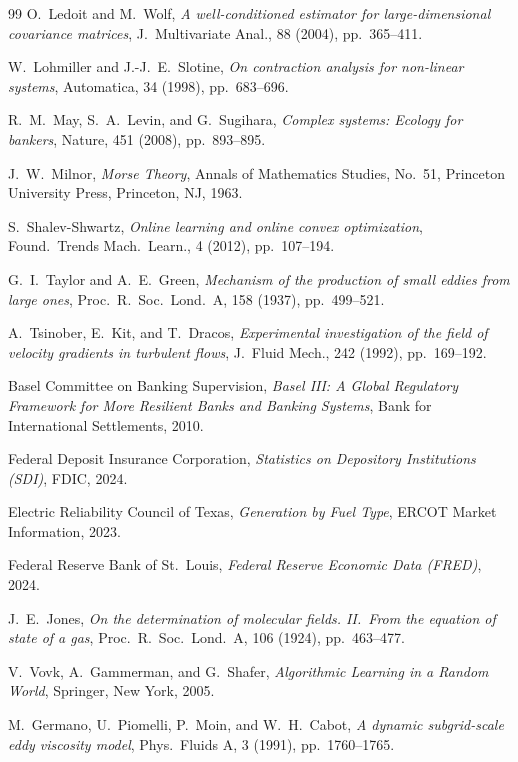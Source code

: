 \documentclass[final]{siamltex}
\begin{document}
\begin{thebibliography}{99}
O.~Ledoit and M.~Wolf,
\emph{A well-conditioned estimator for large-dimensional covariance
matrices},
J.\ Multivariate Anal., 88 (2004), pp.~365--411.

W.~Lohmiller and J.-J.~E.~Slotine,
\emph{On contraction analysis for non-linear systems},
Automatica, 34 (1998), pp.~683--696.

R.~M.~May, S.~A.~Levin, and G.~Sugihara,
\emph{Complex systems: Ecology for bankers},
Nature, 451 (2008), pp.~893--895.

J.~W.~Milnor,
\emph{Morse Theory},
Annals of Mathematics Studies, No.~51, Princeton University Press,
Princeton, NJ, 1963.

S.~Shalev-Shwartz,
\emph{Online learning and online convex optimization},
Found.\ Trends Mach.\ Learn., 4 (2012), pp.~107--194.

G.~I.~Taylor and A.~E.~Green,
\emph{Mechanism of the production of small eddies from large ones},
Proc.\ R.\ Soc.\ Lond.\ A, 158 (1937), pp.~499--521.

A.~Tsinober, E.~Kit, and T.~Dracos,
\emph{Experimental investigation of the field of velocity gradients
in turbulent flows},
J.\ Fluid Mech., 242 (1992), pp.~169--192.

Basel Committee on Banking Supervision,
\emph{Basel III: A Global Regulatory Framework for More Resilient
Banks and Banking Systems},
Bank for International Settlements, 2010.

Federal Deposit Insurance Corporation,
\emph{Statistics on Depository Institutions (SDI)},
FDIC, 2024.

Electric Reliability Council of Texas,
\emph{Generation by Fuel Type},
ERCOT Market Information, 2023.

Federal Reserve Bank of St.\ Louis,
\emph{Federal Reserve Economic Data (FRED)},
2024.

J.~E.~Jones,
\emph{On the determination of molecular fields. II.~From the
equation of state of a gas},
Proc.\ R.\ Soc.\ Lond.\ A, 106 (1924), pp.~463--477.

V.~Vovk, A.~Gammerman, and G.~Shafer,
\emph{Algorithmic Learning in a Random World},
Springer, New York, 2005.

M.~Germano, U.~Piomelli, P.~Moin, and W.~H.~Cabot,
\emph{A dynamic subgrid-scale eddy viscosity model},
Phys.\ Fluids A, 3 (1991), pp.~1760--1765.


\end{thebibliography}
\end{document}

